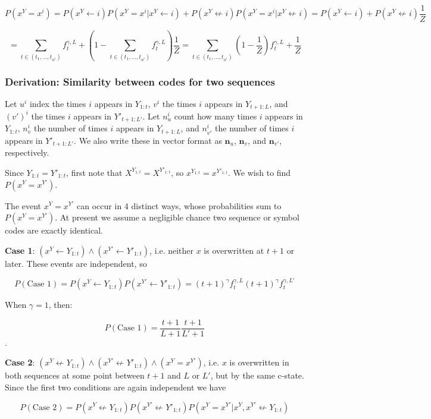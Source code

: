 \documentclass{article}
\begin{document}
$$P(x^Y = x^i) = P(x^Y \leftarrow i)P(x^Y = x^i|x^Y \leftarrow i) + P(x^Y \not \leftarrow i)P(x^Y = x^i|x^Y \not \leftarrow i)
= P(x^Y \leftarrow i) + P(x^Y \not \leftarrow i)\frac{1}{Z}$$

$$= \sum\limits_{t \in (t_1, ..., t_{n^i})}f^{\gamma,L}_t + \left(1 - \sum\limits_{t \in (t_1, ..., t_{n^i})}f^{\gamma,L}_t\right)\frac{1}{Z}
= \sum\limits_{t \in (t_1, ..., t_{n^i})}\left(1 - \frac{1}{Z}\right)f^{\gamma,L}_t + \frac{1}{Z}$$

\subsubsection{Derivation: Similarity between codes for two sequences}

Let $u^i$ index the times $i$ appears in $Y_{1:t}$, $v^i$ the times $i$ appears in $Y_{t+1:L}$, and $(v')^i$ the times $i$ appears in $Y'_{t+1:L'}$. Let $n^i_u$ count how many times $i$ appears in $Y_{1:t}$, $n^i_v$ the number of times $i$ appears in $Y_{t+1:L}$, and $n^i_{v'}$ the number of times $i$ appears in $Y'_{t+1:L'}$. We also write these in vector format as $\mathbf{n}_u$, $\mathbf{n}_v$, and $\mathbf{n}_{v'}$, respectively.

Since $Y_{1:t} = Y'_{1:t}$,  first note that $X^{Y_{1:t}} = X^{Y'_{1:t}}$, so $x^{Y_{1:t}} = x^{Y'_{1:t}}$. We wish to find $P(x^Y = x^{Y'})$.

The event $x^Y = x^{Y'}$ can occur in 4 distinct ways, whose probabilities sum to $P(x^Y = x^{Y'})$. At present we assume a negligible chance two sequence or symbol codes are exactly identical.

\textbf{Case 1}: $(x^Y \leftarrow Y_{1:t}) \land (x^{Y'} \leftarrow Y'_{1:t})$, i.e. neither $x$ is overwritten at $t+1$ or later. These events are independent, so

$$P(\textrm{Case 1}) = P(x^Y \leftarrow Y_{1:t})P(x^{Y'} \leftarrow Y'_{1:t}) = (t+1)^\gamma f^{\gamma,L}_t(t+1)^\gamma f^{\gamma,L'}_t$$

When $\gamma = 1$, then:

$$P(\textrm{Case 1}) = \frac{t+1}{L+1}\frac{t+1}{L'+1}$$.

\textbf{Case 2}: $(x^Y \not\leftarrow Y_{1:t}) \land (x^{Y'} \not\leftarrow Y'_{1:t}) \land (x^Y = x^{Y'})$, i.e. $x$ is overwritten in both sequences at some point between $t+1$ and $L$ or $L'$, but by the same c-state. Since the first two conditions are again independent we have

$$P(\textrm{Case 2}) = P(x^Y \not\leftarrow Y_{1:t})P(x^{Y'} \not\leftarrow Y'_{1:t})P(x^Y = x^{Y'}|x^Y, x^{Y'} \not\leftarrow Y_{1:t})$$
\end{document}
